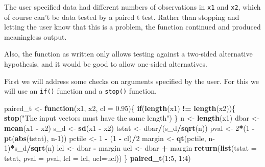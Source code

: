 \documentclass[
]{krantz}
\makeatletter
\newenvironment{Shaded}{\begin{snugshade}}{\end{snugshade}}
\newcommand{\ControlFlowTok}[1]{\textcolor[rgb]{0.27,0.27,0.27}{\textbf{#1}}}
\newcommand{\DataTypeTok}[1]{\textcolor[rgb]{0.27,0.27,0.27}{#1}}
\newcommand{\DecValTok}[1]{\textcolor[rgb]{0.06,0.06,0.06}{#1}}
\newcommand{\FloatTok}[1]{\textcolor[rgb]{0.06,0.06,0.06}{#1}}
\newcommand{\KeywordTok}[1]{\textcolor[rgb]{0.27,0.27,0.27}{\textbf{#1}}}
\newcommand{\NormalTok}[1]{#1}
\newcommand{\OperatorTok}[1]{\textcolor[rgb]{0.43,0.43,0.43}{\textbf{#1}}}
\newcommand{\StringTok}[1]{\textcolor[rgb]{0.5,0.5,0.5}{#1}}
\newenvironment{kframe}{%
\medskip{}
\setlength{\fboxsep}{.8em}
 \def\at@end@of@kframe{}%
 \ifinner\ifhmode%
  \def\at@end@of@kframe{\end{minipage}}%
  \begin{minipage}{\columnwidth}%
 \fi\fi%
 \def\FrameCommand##1{\hskip\@totalleftmargin \hskip-\fboxsep
 \colorbox{shadecolor}{##1}\hskip-\fboxsep
     \hskip-\linewidth \hskip-\@totalleftmargin \hskip\columnwidth}%
 \MakeFramed {\advance\hsize-\width
   \@totalleftmargin\z@ \linewidth\hsize
   \@setminipage}}%
 {\par\unskip\endMakeFramed%
 \at@end@of@kframe}
\renewenvironment{Shaded}{\begin{kframe}}{\end{kframe}}
\makeatother
\begin{document}
The user specified data had different numbers of observations in \texttt{x1} and \texttt{x2}, which of course can't be data tested by a paired t test. Rather than stopping and letting the user know that this is a problem, the function continued and produced meaningless output.

Also, the function as written only allows testing against a two-sided alternative hypothesis, and it would be good to allow one-sided alternatives.

First we will address some checks on arguments specified by the user. For this we will use an \texttt{if()} function and a \texttt{stop()} function.

\begin{Shaded}
\begin{Highlighting}[]
\NormalTok{paired\_t \textless{}{-}}\StringTok{ }\ControlFlowTok{function}\NormalTok{(x1, x2, }\DataTypeTok{cl =} \FloatTok{0.95}\NormalTok{)\{}
    \ControlFlowTok{if}\NormalTok{(}\KeywordTok{length}\NormalTok{(x1) }\OperatorTok{!=}\StringTok{ }\KeywordTok{length}\NormalTok{(x2))\{}
        \KeywordTok{stop}\NormalTok{(}\StringTok{"The input vectors  must have the same length"}\NormalTok{)}
\NormalTok{    \}}
\NormalTok{    n \textless{}{-}}\StringTok{ }\KeywordTok{length}\NormalTok{(x1)}
\NormalTok{    dbar \textless{}{-}}\StringTok{ }\KeywordTok{mean}\NormalTok{(x1 }\OperatorTok{{-}}\StringTok{ }\NormalTok{x2)}
\NormalTok{    s\_d \textless{}{-}}\StringTok{ }\KeywordTok{sd}\NormalTok{(x1 }\OperatorTok{{-}}\StringTok{ }\NormalTok{x2)}
\NormalTok{    tstat \textless{}{-}}\StringTok{ }\NormalTok{dbar}\OperatorTok{/}\NormalTok{(s\_d}\OperatorTok{/}\KeywordTok{sqrt}\NormalTok{(n))}
\NormalTok{    pval \textless{}{-}}\StringTok{ }\DecValTok{2}\OperatorTok{*}\NormalTok{(}\DecValTok{1} \OperatorTok{{-}}\StringTok{ }\KeywordTok{pt}\NormalTok{(}\KeywordTok{abs}\NormalTok{(tstat), n}\DecValTok{{-}1}\NormalTok{))}
\NormalTok{    pctile \textless{}{-}}\StringTok{ }\DecValTok{1} \OperatorTok{{-}}\StringTok{ }\NormalTok{(}\DecValTok{1} \OperatorTok{{-}}\StringTok{ }\NormalTok{cl)}\OperatorTok{/}\DecValTok{2}
\NormalTok{    margin \textless{}{-}}\StringTok{ }\KeywordTok{qt}\NormalTok{(pctile, n}\DecValTok{{-}1}\NormalTok{)}\OperatorTok{*}\NormalTok{s\_d}\OperatorTok{/}\KeywordTok{sqrt}\NormalTok{(n)}
\NormalTok{    lcl \textless{}{-}}\StringTok{ }\NormalTok{dbar }\OperatorTok{{-}}\StringTok{ }\NormalTok{margin}
\NormalTok{    ucl \textless{}{-}}\StringTok{ }\NormalTok{dbar }\OperatorTok{+}\StringTok{ }\NormalTok{margin}
    \KeywordTok{return}\NormalTok{(}\KeywordTok{list}\NormalTok{(}\DataTypeTok{tstat =}\NormalTok{ tstat, }\DataTypeTok{pval =}\NormalTok{ pval, }\DataTypeTok{lcl =}\NormalTok{ lcl, }\DataTypeTok{ucl=}\NormalTok{ucl))}
\NormalTok{\}}
\KeywordTok{paired\_t}\NormalTok{(}\DecValTok{1}\OperatorTok{:}\DecValTok{5}\NormalTok{, }\DecValTok{1}\OperatorTok{:}\DecValTok{4}\NormalTok{)}
\end{Highlighting}
\end{Shaded}
\end{document}
